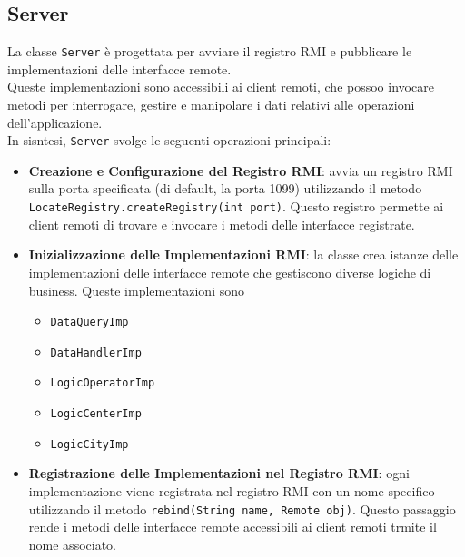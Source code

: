 \subsection{Server}
La classe \texttt{Server} è progettata per avviare il registro RMI e pubblicare le implementazioni delle interfacce remote.\\
Queste implementazioni sono accessibili ai client remoti, che possoo invocare metodi per interrogare, gestire e manipolare i dati relativi alle operazioni dell'applicazione.\\
In sisntesi, \texttt{Server} svolge le seguenti operazioni principali:
\begin{itemize}
    \item \textbf{Creazione e Configurazione del Registro RMI}: avvia un registro RMI sulla porta specificata (di default, la porta 1099) utilizzando il metodo\\
          \texttt{LocateRegistry.createRegistry(int port)}. Questo registro permette ai client remoti di trovare e invocare i metodi delle interfacce registrate.
    \item \textbf{Inizializzazione delle Implementazioni RMI}: la classe crea istanze delle implementazioni delle interfacce remote che gestiscono diverse logiche di business.
          Queste implementazioni sono
          \begin{itemize}
              \item \texttt{DataQueryImp}
              \item \texttt{DataHandlerImp}
              \item \texttt{LogicOperatorImp}
              \item \texttt{LogicCenterImp}
              \item \texttt{LogicCityImp}
          \end{itemize}
    \item \textbf{Registrazione delle Implementazioni nel Registro RMI}: ogni implementazione viene registrata nel registro RMI con un nome specifico utilizzando il metodo
          \texttt{rebind(String name, Remote obj)}. Questo passaggio rende i metodi delle interfacce remote accessibili ai client remoti trmite il nome associato.
\end{itemize}

